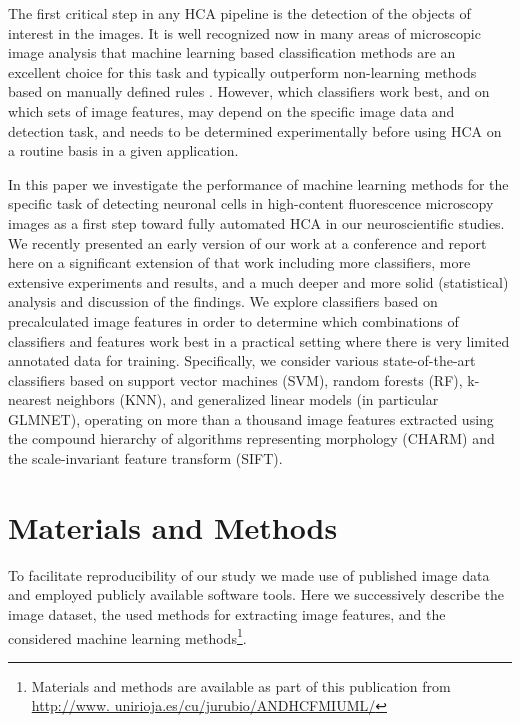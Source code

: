 The first critical step in any HCA pipeline is the detection of the objects of interest in the images. It is well recognized now in many areas of microscopic image analysis that machine learning based classification methods are an excellent choice for this task and typically outperform non-learning methods based on manually defined rules \cite{horvath2011machine, sommer2013machine, kraus2016computer, arganda2017trainable}. However, which classifiers work best, and on which sets of image features, may depend on the specific image data and detection task, and needs to be determined experimentally before using HCA on a routine basis in a given application.

In this paper we investigate the performance of machine learning methods for the specific task of detecting neuronal cells in high-content fluorescence microscopy images as a first step toward fully automated HCA in our neuroscientific studies. We recently presented an early version of our work at a conference \cite{mata2016automatic} and report here on a significant extension of that work including more classifiers, more extensive experiments and results, and a much deeper and more solid (statistical) analysis and discussion of the findings. We explore classifiers based on precalculated image features in order to determine which combinations of classifiers and features work best in a practical setting where there is very limited annotated data for training. Specifically, we consider various state-of-the-art classifiers based on support vector machines (SVM), random forests (RF), k-nearest neighbors (KNN), and generalized linear models (in particular GLMNET), operating on more than a thousand image features extracted using the compound hierarchy of algorithms representing morphology (CHARM) and the scale-invariant feature transform (SIFT).

\section{Materials and Methods}
\label{sec:matmet}

To facilitate reproducibility of our study we made use of published image data and employed publicly available software tools. Here we successively describe the image dataset, the used methods for extracting image features, and the considered machine learning methods\footnote{Materials and methods are available as part of this publication from \\\url{http://www. unirioja.es/cu/jurubio/ANDHCFMIUML/}}.

